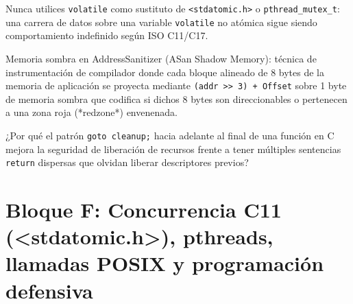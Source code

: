 \documentclass{book}
\begin{document}
\begin{tcolorbox}[title={Consejo}, studiumtip, breakable]

Nunca utilices \texttt{volatile} como sustituto de \texttt{<stdatomic.h>} o \texttt{pthread\_mutex\_t}: una carrera de datos sobre una variable \texttt{volatile} no atómica sigue siendo comportamiento indefinido según ISO C11/C17.
\end{tcolorbox}

\begin{tcolorbox}[title={Definición}, studiumdef, breakable]

Memoria sombra en AddressSanitizer (ASan Shadow Memory): técnica de instrumentación de compilador donde cada bloque alineado de 8 bytes de la memoria de aplicación se proyecta mediante \texttt{(addr >> 3) + Offset} sobre 1 byte de memoria sombra que codifica si dichos 8 bytes son direccionables o pertenecen a una zona roja (*redzone*) envenenada.
\end{tcolorbox}

\begin{tcolorbox}[title={Autoficha}, studiumcheck, breakable]

¿Por qué el patrón \texttt{goto cleanup;} hacia adelante al final de una función en C mejora la seguridad de liberación de recursos frente a tener múltiples sentencias \texttt{return} dispersas que olvidan liberar descriptores previos?
\end{tcolorbox}

\section{Bloque F: Concurrencia C11 (<stdatomic.h>), pthreads, llamadas POSIX y programación defensiva}
\end{document}
